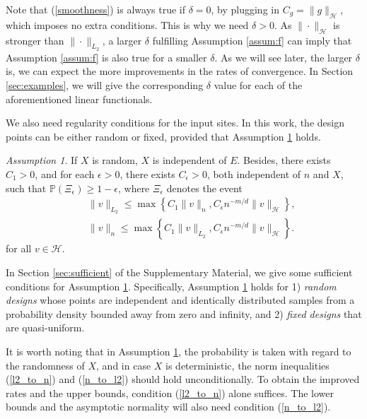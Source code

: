 \documentclass[12pt]{article}
\theoremstyle{plain}
\theoremstyle{remark}
\newtheorem{assumption}{Assumption}
\begin{document}
Note that (\ref{smoothness}) is always true if $\delta=0$, by plugging in $C_g=\|g\|_{\mathcal{H}}$, which imposes no extra conditions. This is why we need $\delta>0$. As $\|\cdot\|_\mathcal{H}$ is stronger than $\|\cdot\|_{L_2}$, a larger $\delta$ fulfilling Assumption \ref{assum:f} can imply that Assumption \ref{assum:f} is also true for a smaller $\delta$. As we will see later, the larger $\delta$ is, we can expect the more improvements in the rates of convergence.
In Section \ref{sec:examples}, we will give the corresponding $\delta$ value for each of the aforementioned linear functionals.

We also need regularity conditions for the input sites. In this work, the design points can be either random or fixed, provided that Assumption \ref{assum:norms} holds.

\begin{assumption}\label{assum:norms}
If $X$ is random, $X$ is independent of $E$.
    Besides, there exists $C_1>0$, and for each $\epsilon>0$, there exists $C_\epsilon>0$, both independent of $n$ and $X$, such that $\mathbb{P}(\Xi_\epsilon)\geq 1-\epsilon$, where $\Xi_\epsilon$ denotes the event
    \begin{eqnarray}
        &&\|v\|_{L_2}\leq \max\left\{C_1 \|v\|_{n},C_\epsilon n^{-m/d}\|v\|_{\mathcal{H}}\right\},\label{l2_to_n}\\
        &&\|v\|_n\leq \max\left\{C_1\|v\|_{L_2},C_\epsilon n^{-m/d}\|v\|_{\mathcal{H}}\right\}.\label{n_to_l2}
    \end{eqnarray}
    for all $v\in \mathcal{H}$.
\end{assumption}

 In Section \ref{sec:sufficient} of the Supplementary Material, we give some sufficient conditions for Assumption \ref{assum:norms}. Specifically, Assumption \ref{assum:norms} holds for 1) \textit{random designs} whose points are independent and identically distributed samples from a probability density bounded away from zero and infinity, and 2) \textit{fixed designs} that are quasi-uniform.

It is worth noting that in Assumption \ref{assum:norms}, the probability is taken with regard to the randomness of $X$, and in case $X$ is deterministic, the norm inequalities (\ref{l2_to_n}) and (\ref{n_to_l2}) should hold unconditionally.
To obtain the improved rates and the upper bounds, condition (\ref{l2_to_n}) alone suffices. The lower bounds and the asymptotic normality will also need condition (\ref{n_to_l2}).
\end{document}
